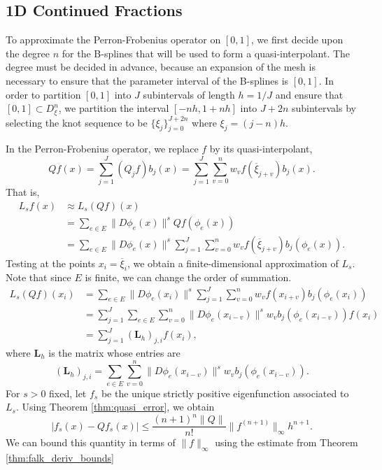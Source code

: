 \documentclass[10pt]{article}
\theoremstyle{definition}
\numberwithin{equation}{section}
\numberwithin{figure}{section}
\numberwithin{table}{section}
\begin{document}
\subsection{1D Continued Fractions}

To approximate the Perron-Frobenius operator on $[0,1]$, we first decide upon the degree $n$ for the B-splines that will be used to form a quasi-interpolant. The degree must be decided in advance, because an expansion of the mesh is necessary to ensure that the parameter interval of the B-splines is $[0,1]$. In order to partition $[0,1]$ into $J$ subintervals of length $h=1/J$ and ensure that $[0,1]\subset D^n_{\xi}$, we partition the interval $[-nh,1+nh]$ into $J+2n$ subintervals by selecting the knot sequence to be $\{\xi_j\}_{j=0}^{J+2n}$ where $\xi_j=(j-n)h$.

In the Perron-Frobenius operator, we replace $f$ by its quasi-interpolant,
$$Qf(x)=\sum_{j=1}^J(Q_jf)b_j(x)=\sum_{j=1}^J\sum_{v=0}^nw_vf(\overline\xi_{j+v})b_j(x).$$
That is,
\begin{align*}
L_sf(x)&\approx L_s(Qf)(x)\\
&=\sum_{e\in E}\|D\phi_e(x)\|^sQf(\phi_e(x))\\
&=\sum_{e\in E}\|D\phi_e(x)\|^s\sum_{j=1}^J\sum_{v=0}^nw_vf(\overline\xi_{j+v})b_j(\phi_e(x)).
\end{align*}
Testing at the points $x_i=\overline\xi_i$, we obtain a finite-dimensional approximation of $L_s$. Note that since $E$ is finite, we can change the order of summation.
\begin{align*}
L_s(Qf)(x_i)&=\sum_{e\in E}\|D\phi_e(x_i)\|^s\sum_{j=1}^J\sum_{v=0}^nw_vf(x_{i+v})b_j(\phi_e(x_i))\\
&=\sum_{j=1}^J\sum_{e\in E}\sum_{v=0}^n\|D\phi_e(x_{i-v})\|^sw_vb_j(\phi_e(x_{i-v}))f(x_i)\\
&=\sum_{j=1}^J(\mathbf{L}_h)_{j,i}f(x_i),
\end{align*}
where $\mathbf{L}_h$ is the matrix whose entries are 
$$(\mathbf{L}_h)_{j,i}=\sum_{e\in E}\sum_{v=0}^n\|D\phi_e(x_{i-v})\|^sw_vb_j(\phi_e(x_{i-v})).$$
For $s>0$ fixed, let $f_s$ be the unique strictly positive eigenfunction associated to $L_s$. Using Theorem \ref{thm:quasi_error}, we obtain
$$|f_s(x)-Qf_s(x)|\leq\frac{(n+1)^n\|Q\|}{n!}\|f^{(n+1)}\|_\infty h^{n+1}.$$
We can bound this quantity in terms of $\|f\|_\infty$ using the estimate from Theorem \ref{thm:falk_deriv_bounds} %
\end{document}
